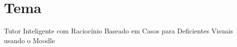 \section{Tema}
Tutor Inteligente com Raciocínio Baseado em Casos para Deficientes Visuais usando o Moodle